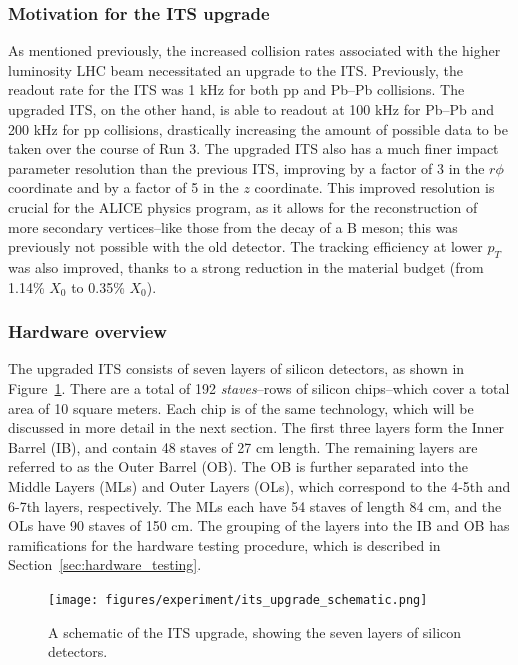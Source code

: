 \subsubsection{Motivation for the ITS upgrade}
As mentioned previously, the increased collision rates associated with the higher luminosity LHC beam necessitated an upgrade to the ITS. Previously, the readout rate for the ITS was 1 kHz for both pp and Pb--Pb collisions. The upgraded ITS, on the other hand, is able to readout at 100 kHz for Pb--Pb and 200 kHz for pp collisions, drastically increasing the amount of possible data to be taken over the course of Run 3. The upgraded ITS also has a much finer impact parameter resolution than the previous ITS, improving by a factor of 3 in the $r\phi$ coordinate and by a factor of 5 in the $z$ coordinate. This improved resolution is crucial for the ALICE physics program, as it allows for the reconstruction of more secondary vertices--like those from the decay of a B meson; this was previously not possible with the old detector. The tracking efficiency at lower $p_T$ was also improved, thanks to a strong reduction in the material budget (from 1.14\% $X_0$ to 0.35\% $X_0$).


\subsubsection{Hardware overview}
The upgraded ITS consists of seven layers of silicon detectors, as shown in Figure~\ref{fig:its_upgrade_schematic}. There are a total of 192 \textit{staves}--rows of silicon chips--which cover a total area of 10 square meters. Each chip is of the same technology, which will be discussed in more detail in the next section. The first three layers form the Inner Barrel (IB), and contain 48 staves of 27 cm length. The remaining layers are referred to as the Outer Barrel (OB). The OB is further separated into the Middle Layers (MLs) and Outer Layers (OLs), which correspond to the 4-5th and 6-7th layers, respectively. The MLs each have 54 staves of length 84 cm, and the OLs have 90 staves of 150 cm. The grouping of the layers into the IB and OB has ramifications for the hardware testing procedure, which is described in Section~\ref{sec:hardware_testing}.

\begin{figure}
    \centering
    \texttt{[image: figures/experiment/its\_upgrade\_schematic.png]}
    \caption{A schematic of the ITS upgrade, showing the seven layers of silicon detectors.}
    \label{fig:its_upgrade_schematic}
\end{figure}


